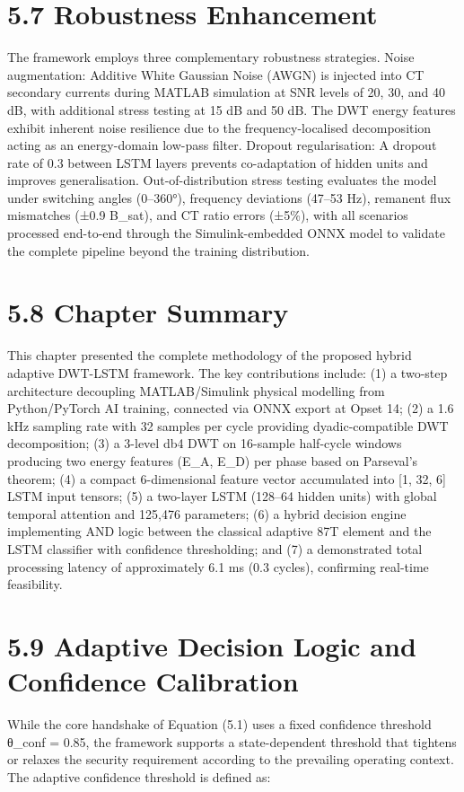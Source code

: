 \section{5.7  Robustness Enhancement}
The framework employs three complementary robustness strategies. Noise augmentation: Additive White Gaussian Noise (AWGN) is injected into CT secondary currents during MATLAB simulation at SNR levels of 20, 30, and 40 dB, with additional stress testing at 15 dB and 50 dB. The DWT energy features exhibit inherent noise resilience due to the frequency-localised decomposition acting as an energy-domain low-pass filter. Dropout regularisation: A dropout rate of 0.3 between LSTM layers prevents co-adaptation of hidden units and improves generalisation. Out-of-distribution stress testing evaluates the model under switching angles (0--360°), frequency deviations (47--53 Hz), remanent flux mismatches (±0.9 B\_sat), and CT ratio errors (±5\%), with all scenarios processed end-to-end through the Simulink-embedded ONNX model to validate the complete pipeline beyond the training distribution.


\section{5.8  Chapter Summary}
This chapter presented the complete methodology of the proposed hybrid adaptive DWT-LSTM framework. The key contributions include: (1) a two-step architecture decoupling MATLAB/Simulink physical modelling from Python/PyTorch AI training, connected via ONNX export at Opset 14; (2) a 1.6 kHz sampling rate with 32 samples per cycle providing dyadic-compatible DWT decomposition; (3) a 3-level db4 DWT on 16-sample half-cycle windows producing two energy features (E\_A, E\_D) per phase based on Parseval's theorem; (4) a compact 6-dimensional feature vector accumulated into [1, 32, 6] LSTM input tensors; (5) a two-layer LSTM (128--64 hidden units) with global temporal attention and 125,476 parameters; (6) a hybrid decision engine implementing AND logic between the classical adaptive 87T element and the LSTM classifier with confidence thresholding; and (7) a demonstrated total processing latency of approximately 6.1 ms (0.3 cycles), confirming real-time feasibility.


\section{5.9  Adaptive Decision Logic and Confidence Calibration}
While the core handshake of Equation (5.1) uses a fixed confidence threshold θ\_conf = 0.85, the framework supports a state-dependent threshold that tightens or relaxes the security requirement according to the prevailing operating context. The adaptive confidence threshold is defined as:

